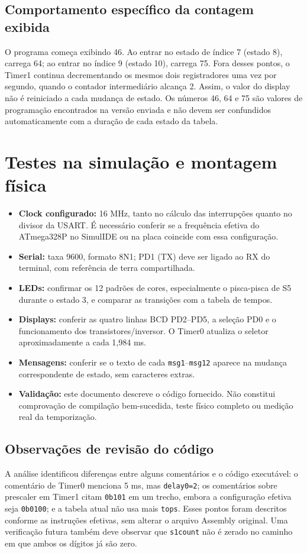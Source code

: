 \documentclass[12pt,a4paper]{article}
\newcommand{\reg}[1]{\texttt{#1}}
\begin{document}
\subsection{Comportamento específico da contagem exibida}
O programa começa exibindo 46. Ao entrar no estado de índice 7 (estado 8), carrega 64; ao entrar no índice 9 (estado 10), carrega 75. Fora desses pontos, o Timer1 continua decrementando os mesmos dois registradores uma vez por segundo, quando o contador intermediário alcança 2. Assim, o valor do display não é reiniciado a cada mudança de estado. Os números 46, 64 e 75 são valores de programação encontrados na versão enviada e não devem ser confundidos automaticamente com a duração de cada estado da tabela.

\section{Testes na simulação e montagem física}
\begin{itemize}
\item \textbf{Clock configurado:} 16 MHz, tanto no cálculo das interrupções quanto no divisor da USART. É necessário conferir se a frequência efetiva do ATmega328P no SimulIDE ou na placa coincide com essa configuração.
\item \textbf{Serial:} taxa 9600, formato 8N1; PD1 (TX) deve ser ligado ao RX do terminal, com referência de terra compartilhada.
\item \textbf{LEDs:} confirmar os 12 padrões de cores, especialmente o pisca-pisca de S5 durante o estado 3, e comparar as transições com a tabela de tempos.
\item \textbf{Displays:} conferir as quatro linhas BCD PD2--PD5, a seleção PD0 e o funcionamento dos transistores/inversor. O Timer0 atualiza o seletor aproximadamente a cada 1,984 ms.
\item \textbf{Mensagens:} conferir se o texto de cada \reg{msg1}--\reg{msg12} aparece na mudança correspondente de estado, sem caracteres extras.
\item \textbf{Validação:} este documento descreve o código fornecido. Não constitui comprovação de compilação bem-sucedida, teste físico completo ou medição real da temporização.
\end{itemize}
\subsection{Observações de revisão do código}
A análise identificou diferenças entre alguns comentários e o código executável: o comentário de Timer0 menciona 5 ms, mas \reg{delay0=2}; os comentários sobre prescaler em Timer1 citam \reg{0b101} em um trecho, embora a configuração efetiva seja \reg{0b0100}; e a tabela atual não usa mais \reg{tops}. Esses pontos foram descritos conforme as instruções efetivas, sem alterar o arquivo Assembly original. Uma verificação futura também deve observar que \reg{s1count} não é zerado no caminho em que ambos os dígitos já são zero.
\end{document}
